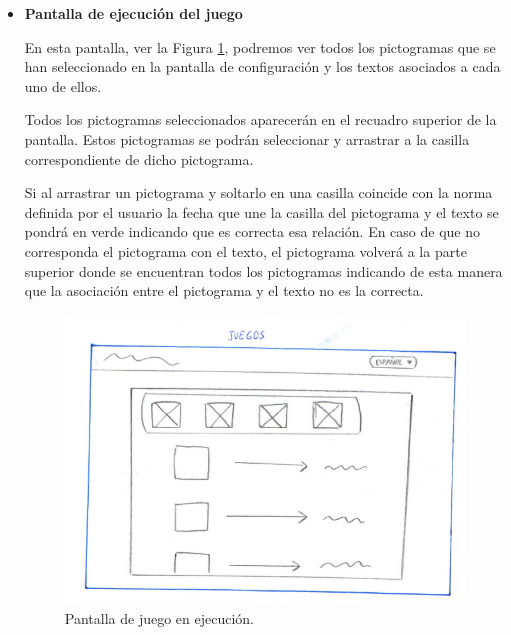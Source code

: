 \begin{itemize}
\begin{itemize}
		
		Las funcionalidades que podemos encontrar en la parte del tablero son las siguientes:
		
		\begin{itemize}
			\item \textbf{Añadir una nueva casilla}: al pulsar sobre este botón se añadirá sobre el tablero sin cuadricular una casilla para insertar un pictograma, imagen, icono o figura geométrica, una flecha y un campo de texto.
			Esto permitirá crear una asociación entre un pictograma y su texto correspondiente para posteriormente ejecutar el juego.
			
			\item \textbf{Jugar}: en la parte superior tendremos un botón que al pulsarlo ejecutará el juego con las normas que estén creadas. Este botón al pulsarlo nos llevará a la pantalla de juego, ver Figura \ref{fig:juegojorge}.
			
		\end{itemize}
		
		\item \textbf{Pantalla de ejecución del juego}
		
		En esta pantalla, ver la Figura \ref{fig:juegojorge},  podremos ver todos los pictogramas que se han seleccionado en la pantalla de configuración y los textos asociados a cada uno de ellos.
		
		Todos los pictogramas seleccionados aparecerán en el recuadro superior de la pantalla. Estos pictogramas se podrán seleccionar y arrastrar a la casilla correspondiente de dicho pictograma.
		
		Si al arrastrar un pictograma y soltarlo en una casilla coincide con la norma definida por el usuario la fecha que une la casilla del pictograma y el texto se pondrá en verde indicando que es correcta esa relación. En caso de que no corresponda el pictograma con el texto, el pictograma volverá a la parte superior donde se encuentran todos los pictogramas indicando de esta manera que la asociación entre el pictograma y el texto no es la correcta.
		
		\begin{figure}[h!]
			\centering
			\includegraphics[width=0.7\linewidth]{Imagenes/Bitmap/juegoJorge}
			\caption{Pantalla de juego en ejecución.}
			\label{fig:juegojorge}
		\end{figure}
		
	\end{itemize}
	
\end{itemize}

